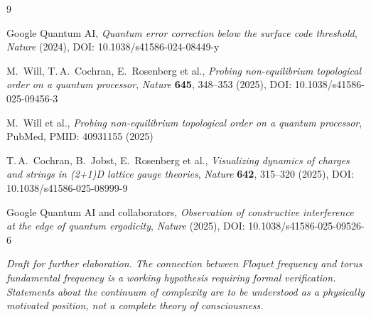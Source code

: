\vspace{0.8cm}

\begin{thebibliography}{9}

Google Quantum AI,
\textit{Quantum error correction below the surface code threshold},
\textit{Nature} (2024), DOI: 10.1038/s41586-024-08449-y

M.~Will, T.\,A.~Cochran, E.~Rosenberg et al.,
\textit{Probing non-equilibrium topological order on a quantum processor},
\textit{Nature} \textbf{645}, 348--353 (2025),
DOI: 10.1038/s41586-025-09456-3

M.~Will et al.,
\textit{Probing non-equilibrium topological order on a quantum processor},
PubMed, PMID: 40931155 (2025)

T.\,A.~Cochran, B.~Jobst, E.~Rosenberg et al.,
\textit{Visualizing dynamics of charges and strings in (2+1)D lattice gauge theories},
\textit{Nature} \textbf{642}, 315--320 (2025),
DOI: 10.1038/s41586-025-08999-9

Google Quantum AI and collaborators,
\textit{Observation of constructive interference at the edge of quantum ergodicity},
\textit{Nature} (2025), DOI: 10.1038/s41586-025-09526-6

\end{thebibliography}

\vspace{0.5cm}
\noindent
\textit{Draft for further elaboration. The connection between Floquet frequency
and torus fundamental frequency is a working hypothesis requiring formal verification.
Statements about the continuum of complexity are to be understood as a physically
motivated position, not a complete theory of consciousness.}
